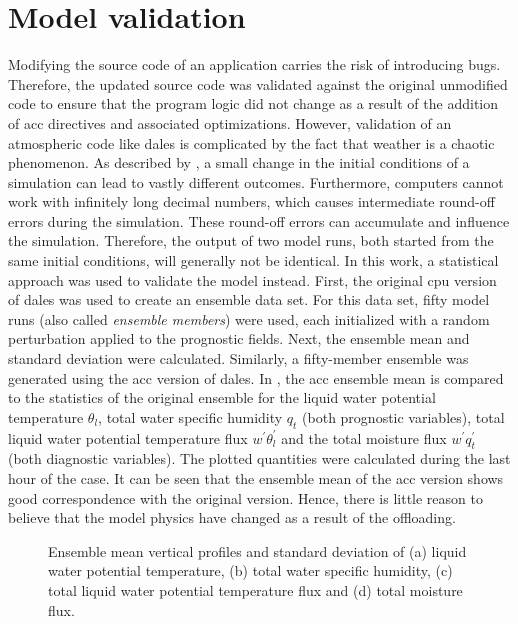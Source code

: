 \section{Model validation}
Modifying the source code of an application carries the risk of introducing bugs. Therefore, the updated source code was validated against the original unmodified code to ensure that the program logic did not change as a result of the addition of \acrshort{acc} directives and associated optimizations. However, validation of an atmospheric code like \acrshort{dales} is complicated by the fact that weather is a chaotic phenomenon. As described by \citet{lorenzDeterministicNonperiodicFlow1963}, a small change in the initial conditions of a simulation can lead to vastly different outcomes. Furthermore, computers cannot work with infinitely long decimal numbers, which causes intermediate round-off errors during the simulation. These round-off errors can accumulate and influence the simulation. Therefore, the output of two model runs, both started from the same initial conditions, will generally not be identical. In this work, a statistical approach was used to validate the model instead. First, the original \acrshort{cpu} version of \acrshort{dales} was used to create an ensemble data set. For this data set, fifty model runs (also called \emph{ensemble members}) were used, each initialized with a random perturbation applied to the prognostic fields. Next, the ensemble mean and standard deviation were calculated. Similarly, a fifty-member ensemble was generated using the \acrshort{acc} version of \acrshort{dales}. In , the \acrshort{acc} ensemble mean is compared to the statistics of the original ensemble for the liquid water potential temperature $\theta_l$, total water specific humidity $q_t$ (both prognostic variables), total liquid water potential temperature flux $w^\prime \theta_l^\prime$ and the total moisture flux $w^\prime q_t^\prime$ (both diagnostic variables). The plotted quantities were calculated during the last hour of the case. It can be seen that the ensemble mean of the \acrshort{acc} version shows good correspondence with the original version. Hence, there is little reason to believe that the model physics have changed as a result of the offloading.

\begin{figure}
    \centering
    
    \caption{Ensemble mean vertical profiles and standard deviation of (a) liquid water potential temperature, (b) total water specific humidity, (c) total liquid water potential temperature flux and (d) total moisture flux.}
    \label{fig:validation}
\end{figure}

